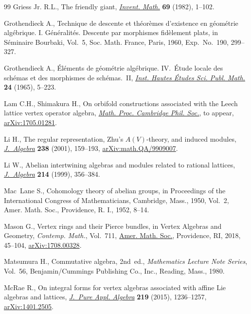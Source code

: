 \documentclass[pdftex]{sigma}
\theoremstyle{definition}
\begin{document}
\begin{thebibliography}{99}
Griess Jr. R.L., The friendly giant, \href{https://doi.org/10.1007/BF01389186}{\textit{Invent. Math.}} \textbf{69} (1982),
 1--102.

Grothendieck A., Technique de descente et th\'{e}or\`emes d'existence en
 g\'{e}om\'{e}trie alg\'{e}brique. {I}. {G}\'{e}n\'{e}ralit\'{e}s. {D}escente
 par morphismes fid\`element plats, in S\'{e}minaire {B}ourbaki, {V}ol.~5,
 Soc. Math. France, Paris, 1960, Exp.~No.~190, 299--327.

Grothendieck A., \'{E}l\'{e}ments de g\'{e}om\'{e}trie alg\'{e}brique.
 {IV}.~\'{E}tude locale des sch\'{e}mas et des morphismes de
 sch\'{e}mas.~{II}, \href{https://doi.org/10.1007/BF02684322}{\textit{Inst. Hautes \'{E}tudes Sci. Publ. Math.}}
 \textbf{24} (1965), 5--223.

Lam C.H., Shimakura H., On orbifold constructions associated with the Leech
 lattice vertex operator algebra, \href{https://doi.org/10.1017/S0305004118000658}{\textit{Math. Proc. Cambridge Phil. Soc.}},
 {t}o appear, \href{https://arxiv.org/abs/1705.01281}{arXiv:1705.01281}.

Li H., The regular representation, {Z}hu's {$A(V)$}-theory, and induced
 modules, \href{https://doi.org/10.1006/jabr.2000.8627}{\textit{J.~Algebra}} \textbf{238} (2001), 159--193,
 \href{https://arxiv.org/abs/math.QA/9909007}{arXiv:math.QA/9909007}.

Li W., Abelian intertwining algebras and modules related to rational lattices,
 \href{https://doi.org/10.1006/jabr.1998.7686}{\textit{J.~Algebra}} \textbf{214} (1999), 356--384.

Mac~Lane S., Cohomology theory of abelian groups, in Proceedings of the
 {I}nternational {C}ongress of {M}a\-the\-maticians, {C}ambridge, {M}ass., 1950,
 Vol.~2, Amer. Math. Soc., Providence, R. I., 1952, 8--14.

Mason G., Vertex rings and their {P}ierce bundles, in Vertex Algebras and
 Geometry, \textit{Contemp. Math.}, Vol.~711, \href{https://doi.org/10.1090/conm/711/14303}{Amer. Math. Soc.}, Providence,
 RI, 2018, 45--104, \href{https://arxiv.org/abs/1708.00328}{arXiv:1708.00328}.

Matsumura H., Commutative algebra, 2nd~ed., \textit{Mathematics Lecture Note Series},
 Vol.~56, Benjamin/Cummings Publishing Co., Inc., Reading, Mass.,
 1980.

McRae R., On integral forms for vertex algebras associated with affine {L}ie
 algebras and lattices, \href{https://doi.org/10.1016/j.jpaa.2014.06.003}{\textit{J.~Pure Appl. Algebra}} \textbf{219} (2015),
 1236--1257, \href{https://arxiv.org/abs/1401.2505}{arXiv:1401.2505}.


\end{thebibliography}
\end{document}
